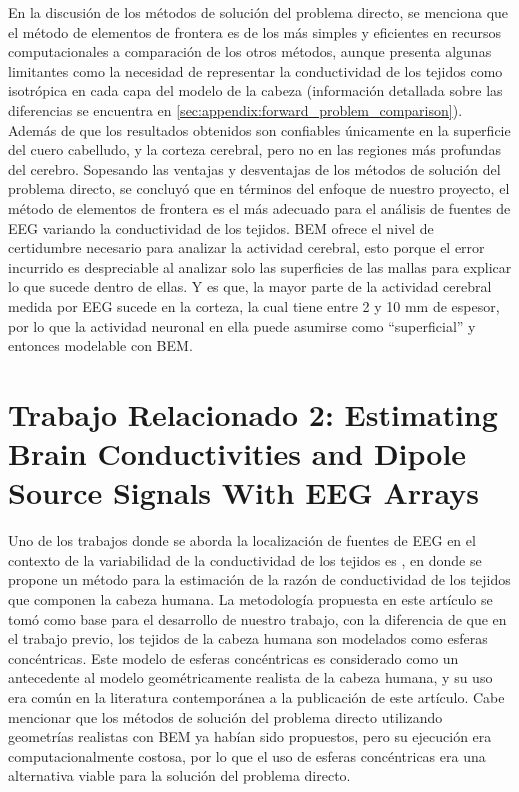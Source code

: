 En la discusión de los métodos de solución del problema directo, se menciona que el método de elementos de frontera es de los más simples y eficientes en recursos computacionales a comparación de los otros métodos, aunque presenta algunas limitantes como la necesidad de representar la conductividad de los tejidos como isotrópica en cada capa del modelo de la cabeza (información detallada sobre las diferencias se encuentra en \cref{sec:appendix:forward_problem_comparison}).
Además de que los resultados obtenidos son confiables únicamente en la superficie del cuero cabelludo, y la corteza cerebral, pero no en las regiones más profundas del cerebro. Sopesando las ventajas y desventajas de los métodos de solución del problema directo, se concluyó que en términos del enfoque de nuestro proyecto, el método de elementos de frontera es el más adecuado para el análisis de fuentes de EEG variando la conductividad de los tejidos.
BEM ofrece el nivel de certidumbre necesario para analizar la actividad cerebral, esto porque el error incurrido es despreciable al analizar solo las superficies de las mallas para explicar lo que sucede dentro de ellas. 
Y es que, la mayor parte de la actividad cerebral medida por EEG sucede en la corteza, la cual tiene entre 2 y 10 mm de espesor, por lo que la actividad neuronal en ella puede asumirse como ``superficial'' y entonces modelable con BEM.

\section{Trabajo Relacionado 2: Estimating Brain Conductivities and Dipole Source Signals With EEG Arrays}
\label{sec:related:gutierrez}

Uno de los trabajos donde se aborda la localización de fuentes de EEG en el contexto de la variabilidad de la conductividad de los tejidos es \cite{Gutierrez2004}, en donde se propone un método para la estimación de la razón de conductividad de los tejidos que componen la cabeza humana.
La metodología propuesta en este artículo se tomó como base para el desarrollo de nuestro trabajo, con la diferencia de que en el trabajo previo, los tejidos de la cabeza humana son modelados como esferas concéntricas.
Este modelo de esferas concéntricas es considerado como un antecedente al modelo geométricamente realista de la cabeza humana, y su uso era común en la literatura contemporánea a la publicación de este artículo.
Cabe mencionar que los métodos de solución del problema directo utilizando geometrías realistas con BEM ya habían sido propuestos, pero su ejecución era computacionalmente costosa, por lo que el uso de esferas concéntricas era una alternativa viable para la solución del problema directo.

